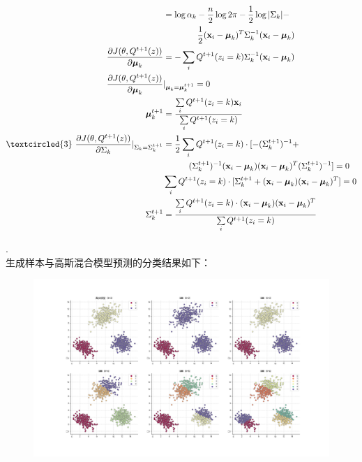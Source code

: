 \documentclass[fleqn,answers]{exam}
\begin{document}
\begin{questions}
\begin{solution}
\begin{align*}
        &=\log\alpha_k -
            \frac{n}{2}\log 2\pi -
            \frac{1}{2}\log \vert \Sigma_k \vert - \\
            &\hspace{40pt} \frac{1}{2}(\mathbf{x}_i-\boldsymbol{\mu}_k)^T \Sigma_k^{-1} (\mathbf{x}_i-\boldsymbol{\mu}_k)\\
    \frac{\partial J(\theta,Q^{t+1}(z))}{\partial \boldsymbol{\mu}_k}&=-\sum\limits_i Q^{t+1}(z_i=k) \Sigma_k^{-1} (\mathbf{x}_i-\boldsymbol{\mu}_k)\\
    \frac{\partial J(\theta,Q^{t+1}(z))}{\partial \boldsymbol{\mu}_k}&\vert_{\boldsymbol{\mu}_k=\boldsymbol{\mu}_k^{t+1}}=0\\
    \boldsymbol{\mu}_k^{t+1}&=\frac{\sum\limits_i Q^{t+1}(z_i=k)\mathbf{x}_i}{\sum\limits_i Q^{t+1}(z_i=k)}\\
    \textcircled{3}~
    \frac{\partial J(\theta,Q^{t+1}(z))}{\partial \Sigma_k}\vert_{\Sigma_k=\Sigma_k^{t+1}}
        &=\frac{1}{2}\sum\limits_i Q^{t+1}(z_i=k) \cdot [-(\Sigma_k^{t+1})^{-1} + \\
            &\hspace{30pt} (\Sigma_k^{t+1})^{-1} (\mathbf{x}_i-\boldsymbol{\mu}_k) (\mathbf{x}_i-\boldsymbol{\mu}_k)^T (\Sigma_k^{t+1})^{-1}]=0\\
        &\sum\limits_i  Q^{t+1}(z_i=k) \cdot [\Sigma_k^{t+1} + (\mathbf{x}_i-\boldsymbol{\mu}_k) (\mathbf{x}_i-\boldsymbol{\mu}_k)^T]=0\\
        \Sigma_k^{t+1} &=\frac{
            \sum\limits_i Q^{t+1}(z_i=k) \cdot
            (\mathbf{x}_i-\boldsymbol{\mu}_k) (\mathbf{x}_i-\boldsymbol{\mu}_k)^T
            }
            {\sum\limits_i Q^{t+1}(z_i=k)}
\end{align*}
\end{solution}
\end{questions}
.\\
生成样本与高斯混合模型预测的分类结果如下：
\begin{figure}[!ht]
    \centering
    \includegraphics[width=18cm]{./figures/3.png}
\end{figure}\\
\end{document}
